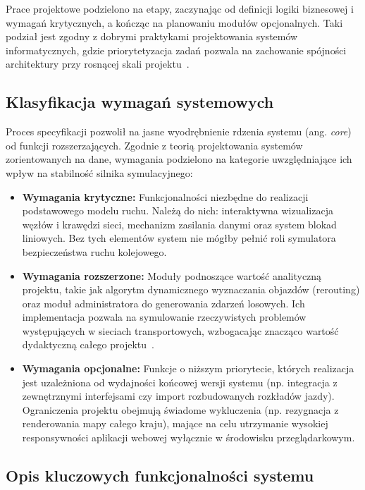 \documentclass[twoside]{projektInzynierskiMS1z}
\begin{document}
Prace projektowe podzielono na etapy, zaczynając od definicji logiki biznesowej
i wymagań krytycznych, a kończąc na planowaniu modułów opcjonalnych. Taki podział
jest zgodny z dobrymi praktykami projektowania systemów informatycznych, gdzie
priorytetyzacja zadań pozwala na zachowanie spójności architektury przy rosnącej
skali projektu~\cite{martin2017clean}.

\subsection{Klasyfikacja wymagań systemowych}

Proces specyfikacji pozwolił na jasne wyodrębnienie rdzenia systemu (ang. \emph{core})
od funkcji rozszerzających. Zgodnie z teorią projektowania systemów zorientowanych na
dane, wymagania podzielono na kategorie uwzględniające ich wpływ na stabilność silnika
symulacyjnego:

\begin{itemize}
\item \textbf{Wymagania krytyczne:} Funkcjonalności niezbędne do realizacji
podstawowego modelu ruchu. Należą do nich: interaktywna wizualizacja węzłów i krawędzi
sieci, mechanizm zasilania danymi oraz system blokad liniowych. Bez tych elementów
system nie mógłby pełnić roli symulatora bezpieczeństwa ruchu kolejowego.

\item \textbf{Wymagania rozszerzone:} Moduły podnoszące wartość analityczną projektu,
takie jak algorytm dynamicznego wyznaczania objazdów (rerouting) oraz moduł
administratora do generowania zdarzeń losowych. Ich implementacja pozwala na
symulowanie rzeczywistych problemów występujących w sieciach transportowych,
wzbogacając znacząco wartość dydaktyczną całego projektu~\cite{sommerville2016}.

\item \textbf{Wymagania opcjonalne:} Funkcje o niższym priorytecie, których realizacja
jest uzależniona od wydajności końcowej wersji systemu (np. integracja z zewnętrznymi
interfejsami czy import rozbudowanych rozkładów jazdy). Ograniczenia projektu obejmują
świadome wykluczenia (np. rezygnacja z renderowania mapy całego kraju), mające na celu
utrzymanie wysokiej responsywności aplikacji webowej wyłącznie w środowisku przeglądarkowym.
\end{itemize}

\subsection{Opis kluczowych funkcjonalności systemu}
\end{document}
